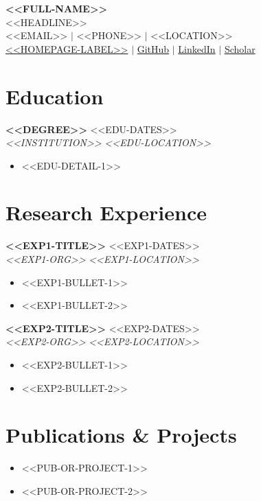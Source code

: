 \documentclass[10pt,a4paper]{article}
\newcommand{\entry}[4]{%
  \textbf{#1} \hfill \textcolor{muted}{#3}\\[1pt]
  \textit{#2} \hfill \textcolor{muted}{\textit{#4}}\\[2pt]
}
\begin{document}
\begin{center}
  {\huge\bfseries <<FULL-NAME>>}\\[4pt]
  \textcolor{muted}{<<HEADLINE>>}\\[4pt]
  <<EMAIL>> \;$\vert$\; <<PHONE>> \;$\vert$\; <<LOCATION>>\\[2pt]
  \href{<<HOMEPAGE-URL>>}{<<HOMEPAGE-LABEL>>} \;$\vert$\;
  \href{<<GITHUB-URL>>}{GitHub} \;$\vert$\;
  \href{<<LINKEDIN-URL>>}{LinkedIn} \;$\vert$\;
  \href{<<SCHOLAR-URL>>}{Scholar}
\end{center}

\section{Education}
\entry{<<DEGREE>>}{<<INSTITUTION>>}{<<EDU-DATES>>}{<<EDU-LOCATION>>}
\begin{itemize}
  \item <<EDU-DETAIL-1>>  %
\end{itemize}

\section{Research Experience}
\entry{<<EXP1-TITLE>>}{<<EXP1-ORG>>}{<<EXP1-DATES>>}{<<EXP1-LOCATION>>}
\begin{itemize}
  \item <<EXP1-BULLET-1>>
  \item <<EXP1-BULLET-2>>
\end{itemize}

\entry{<<EXP2-TITLE>>}{<<EXP2-ORG>>}{<<EXP2-DATES>>}{<<EXP2-LOCATION>>}
\begin{itemize}
  \item <<EXP2-BULLET-1>>
  \item <<EXP2-BULLET-2>>
\end{itemize}

\section{Publications \& Projects}
\begin{itemize}
  \item <<PUB-OR-PROJECT-1>>
  \item <<PUB-OR-PROJECT-2>>
\end{itemize}
\end{document}
